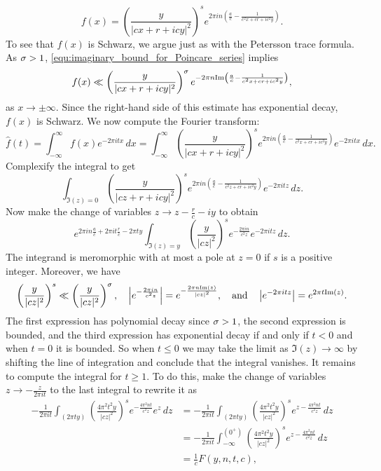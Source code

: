     \[
      f(x) = \left(\frac{y}{|cx+r+icy|^{2}}\right)^{s}e^{2\pi in\left(\frac{a}{c}-\frac{1}{c^{2}x+cr+ic^{2}y}\right)}.
    \]
    To see that $f(x)$ is Schwarz, we argue just as with the Petersson trace formula. As $\sigma > 1$, \cref{equ:imaginary_bound_for_Poincare_series} implies
    \[
      f(x) \ll \left(\frac{y}{|cx+r+icy|^{2}}\right)^{\sigma}e^{-2\pi n\mathrm{Im}\left(\frac{a}{c}-\frac{1}{c^{2}x+cr+ic^{2}y}\right)},
    \]
    as $x \to \pm\infty$. Since the right-hand side of this estimate has exponential decay, $f(x)$ is Schwarz. We now compute the Fourier transform:
    \[
      \hat{f}(t) = \int_{-\infty}^{\infty}f(x)e^{-2\pi itx}\,dx = \int_{-\infty}^{\infty}\left(\frac{y}{|cx+r+icy|^{2}}\right)^{s}e^{2\pi in\left(\frac{a}{c}-\frac{1}{c^{2}x+cr+ic^{2}y}\right)}e^{-2\pi itx}\,dx.
    \]
    Complexify the integral to get
    \[
      \int_{\Im(z) = 0}\left(\frac{y}{|cz+r+icy|^{2}}\right)^{s}e^{2\pi in\left(\frac{a}{c}-\frac{1}{c^{2}z+cr+ic^{2}y}\right)}e^{-2\pi itz}\,dz.
    \]
    Now make the change of variables $z \to z-\frac{r}{c}-iy$ to obtain
    \[
      e^{2\pi in\frac{a}{c}+2\pi it\frac{r}{c}-2\pi ty}\int_{\Im(z) = y}\left(\frac{y}{|cz|^{2}}\right)^{s}e^{-\frac{2\pi in}{c^{2}z}}e^{-2\pi itz}\,dz.
    \]
    The integrand is meromorphic with at most a pole at $z = 0$ if $s$ is a positive integer. Moreover, we have
    \[
      \left(\frac{y}{|cz|^{2}}\right)^{s} \ll \left(\frac{y}{|cz|^{2}}\right)^{\sigma}, \quad \left|e^{-\frac{2\pi in}{c^{2}z}}\right| = e^{-\frac{2\pi n\mathrm{Im}(z)}{|cz|^{2}}}, \quad \text{and} \quad \left|e^{-2\pi itz}\right| = e^{2\pi t\mathrm{Im}(z)}.
    \]
    The first expression has polynomial decay since $\sigma > 1$, the second expression is bounded, and the third expression has exponential decay if and only if $t < 0$ and when $t = 0$ it is bounded. So when $t \le 0$ we may take the limit as $\Im(z) \to \infty$  by shifting the line of integration and conclude that the integral vanishes. It remains to compute the integral for $t \ge 1$. To do this, make the change of variables $z \to -\frac{z}{2\pi it}$ to the last integral to rewrite it as
    \begin{align*}
      -\frac{1}{2\pi it}\int_{(2\pi ty)}\left(\frac{4\pi^{2}t^{2}y}{|cz|^{2}}\right)^{s}e^{-\frac{4\pi^{2}nt}{c^{2}z}}e^{z}\,dz &= -\frac{1}{2\pi it}\int_{(2\pi ty)}\left(\frac{4\pi^{2}t^{2}y}{|cz|^{2}}\right)^{s}e^{z-\frac{4\pi^{2}nt}{c^{2}z}}\,dz \\
      &= -\frac{1}{2\pi it}\int_{-\infty}^{(0^{+})}\left(\frac{4\pi^{2}t^{2}y}{|cz|^{2}}\right)^{s}e^{z-\frac{4\pi^{2}nt}{c^{2}z}}\,dz \\
      &= \frac{1}{c}F(y,n,t,c),
    \end{align*}
